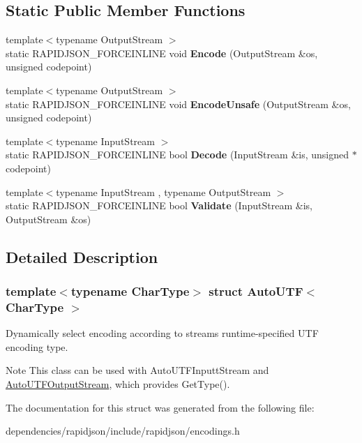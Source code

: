 \subsection*{Static Public Member Functions}
\begin{DoxyCompactItemize}
\item 
\mbox{\label{struct_auto_u_t_f_a414946115261f886e74dd42cb4b98781}} 
{\footnotesize template$<$typename Output\+Stream $>$ }\\static R\+A\+P\+I\+D\+J\+S\+O\+N\+\_\+\+F\+O\+R\+C\+E\+I\+N\+L\+I\+NE void {\bfseries Encode} (Output\+Stream \&os, unsigned codepoint)
\item 
\mbox{\label{struct_auto_u_t_f_a05f5dcd1f153b61b763e44ed452de251}} 
{\footnotesize template$<$typename Output\+Stream $>$ }\\static R\+A\+P\+I\+D\+J\+S\+O\+N\+\_\+\+F\+O\+R\+C\+E\+I\+N\+L\+I\+NE void {\bfseries Encode\+Unsafe} (Output\+Stream \&os, unsigned codepoint)
\item 
\mbox{\label{struct_auto_u_t_f_aa5e3c1dc23dbb75f6442ff69500a35b0}} 
{\footnotesize template$<$typename Input\+Stream $>$ }\\static R\+A\+P\+I\+D\+J\+S\+O\+N\+\_\+\+F\+O\+R\+C\+E\+I\+N\+L\+I\+NE bool {\bfseries Decode} (Input\+Stream \&is, unsigned $\ast$codepoint)
\item 
\mbox{\label{struct_auto_u_t_f_a36dd6f226d6a07c12161e21c0aff20b1}} 
{\footnotesize template$<$typename Input\+Stream , typename Output\+Stream $>$ }\\static R\+A\+P\+I\+D\+J\+S\+O\+N\+\_\+\+F\+O\+R\+C\+E\+I\+N\+L\+I\+NE bool {\bfseries Validate} (Input\+Stream \&is, Output\+Stream \&os)
\end{DoxyCompactItemize}


\subsection{Detailed Description}
\subsubsection*{template$<$typename Char\+Type$>$\newline
struct Auto\+U\+T\+F$<$ Char\+Type $>$}

Dynamically select encoding according to stream\textquotesingle{}s runtime-\/specified U\+TF encoding type. 

\begin{DoxyNote}{Note}
This class can be used with Auto\+U\+T\+F\+Inputt\+Stream and \hyperlink{class_auto_u_t_f_output_stream}{Auto\+U\+T\+F\+Output\+Stream}, which provides Get\+Type(). 
\end{DoxyNote}


The documentation for this struct was generated from the following file\+:\begin{DoxyCompactItemize}
\item 
dependencies/rapidjson/include/rapidjson/encodings.\+h\end{DoxyCompactItemize}
